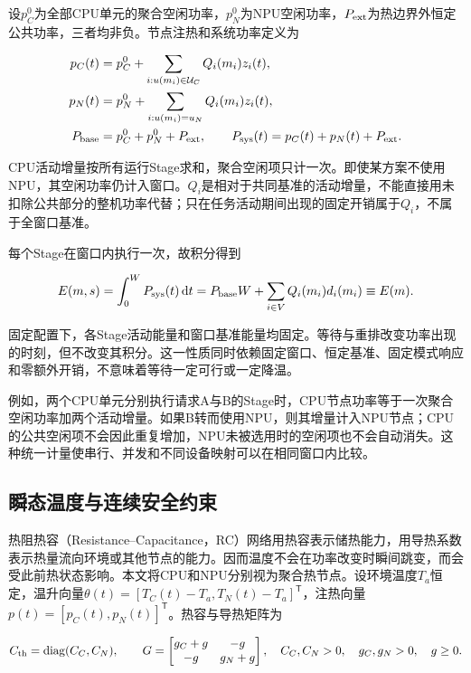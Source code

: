 设\(p_C^0\)为全部CPU单元的聚合空闲功率，\(p_N^0\)为NPU空闲功率，\(P_{\rm ext}\)为热边界外恒定公共功率，三者均非负。节点注热和系统功率定义为

\begin{equation}
\begin{aligned}
p_C(t)&=p_C^0+\sum_{i:u(m_i)\in\mathcal U_C}Q_i(m_i)z_i(t),\\
p_N(t)&=p_N^0+\sum_{i:u(m_i)=u_N}Q_i(m_i)z_i(t),\\
P_{\rm base}&=p_C^0+p_N^0+P_{\rm ext},\qquad
P_{\rm sys}(t)=p_C(t)+p_N(t)+P_{\rm ext}.
\end{aligned}
\label{eq:ch3-9}
\end{equation}

CPU活动增量按所有运行Stage求和，聚合空闲项只计一次。即使某方案不使用NPU，其空闲功率仍计入窗口。\(Q_i\)是相对于共同基准的活动增量，不能直接用未扣除公共部分的整机功率代替；只在任务活动期间出现的固定开销属于\(Q_i\)，不属于全窗口基准。

每个Stage在窗口内执行一次，故积分得到

\begin{equation}
E(m,s)=\int_0^W P_{\rm sys}(t)\,\mathrm dt
=P_{\rm base}W+\sum_{i\in V}Q_i(m_i)d_i(m_i)
\equiv E(m).
\label{eq:ch3-10}
\end{equation}

固定配置下，各Stage活动能量和窗口基准能量均固定。等待与重排改变功率出现的时刻，但不改变其积分。这一性质同时依赖固定窗口、恒定基准、固定模式响应和零额外开销，不意味着等待一定可行或一定降温。


例如，两个CPU单元分别执行请求A与B的Stage时，CPU节点功率等于一次聚合空闲功率加两个活动增量。如果B转而使用NPU，则其增量计入NPU节点；CPU的公共空闲项不会因此重复增加，NPU未被选用时的空闲项也不会自动消失。这种统一计量使串行、并发和不同设备映射可以在相同窗口内比较。

\subsection{瞬态温度与连续安全约束}

热阻热容（Resistance--Capacitance，RC）网络用热容表示储热能力，用导热系数表示热量流向环境或其他节点的能力。因而温度不会在功率改变时瞬间跳变，而会受此前热状态影响。本文将CPU和NPU分别视为聚合热节点。设环境温度\(T_a\)恒定，温升向量\(\theta(t)=[T_C(t)-T_a,T_N(t)-T_a]^{\mathsf T}\)，注热向量\(p(t)=[p_C(t),p_N(t)]^{\mathsf T}\)。热容与导热矩阵为

\begin{equation}
C_{\rm th}=\operatorname{diag}(C_C,C_N),\qquad
G=\begin{bmatrix}g_C+g&-g\\-g&g_N+g\end{bmatrix},
\quad C_C,C_N>0,\quad g_C,g_N>0,\quad g\ge0.
\label{eq:ch3-11}
\end{equation}

